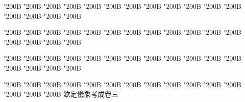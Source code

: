 \begin{正文}
\char"200B\relax{}
\char"200B\relax{}
\char"200B\relax{}
\char"200B\relax{}
\char"200B\relax{}
\char"200B\relax{}
\char"200B\relax{}
\char"200B\relax{}
\char"200B\relax{}
\char"200B\relax{}
\char"200B\relax{}
\char"200B\relax{}
\char"200B\relax{}
\char"200B\relax{}
\char"200B\relax{}
\char"200B\relax
{}\par
\end{正文}\clearpage
{}
\begin{正文}
\char"200B\relax{}
\char"200B\relax{}
\char"200B\relax{}
\char"200B\relax{}
\char"200B\relax{}
\char"200B\relax{}
\char"200B\relax{}
\char"200B\relax{}
\char"200B\relax{}
\char"200B\relax{}
\char"200B\relax{}
\char"200B\relax{}
\char"200B\relax{}
\char"200B\relax{}
\char"200B\relax{}
\char"200B\relax
{}\par
\end{正文}\clearpage
{}
\begin{正文}
\char"200B\relax{}
\char"200B\relax{}
\char"200B\relax{}
\char"200B\relax{}
\char"200B\relax{}
\char"200B\relax{}
\char"200B\relax{}
\char"200B\relax{}
\char"200B\relax{}
\char"200B\relax{}
\char"200B\relax{}
\char"200B\relax{}
\char"200B\relax{}
\char"200B\relax{}
\char"200B\relax{}
\char"200B\relax
{}\par
\end{正文}\clearpage
{}
\begin{正文}
\char"200B\relax{}
\char"200B\relax{}
\char"200B\relax{}
\char"200B\relax{}
\char"200B\relax{}
\char"200B\relax{}
\char"200B\relax{}
\char"200B\relax{}
\char"200B\relax{}
\char"200B\relax{}
\char"200B\relax{}
\char"200B\relax{}
\char"200B\relax{}
\char"200B\relax{}
\char"200B\relax{}
欽定儀象考成卷三
\par

\par\end{正文}\clearpage
